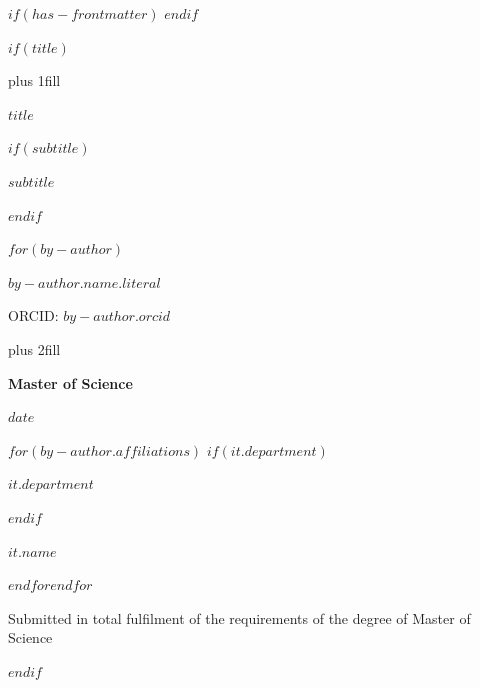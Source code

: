 $if(has-frontmatter)$   
\frontmatter            
$endif$

$if(title)$
\cleardoublepage
\thispagestyle{empty}
{\centering
\hbox{}\vskip 0cm plus 1fill
{\Huge\bfseries $title$ \par}

$if(subtitle)$
\vspace{3ex}
{\Large\bfseries $subtitle$ \par}
$endif$

\vspace{12ex}

$for(by-author)$
{\Large\bfseries $by-author.name.literal$ \par}
\vspace{3ex}
{\Large ORCID: $by-author.orcid$ \par}
\vskip 0cm plus 2fill

{\bfseries\large Master of Science \par}
\vspace{3ex}

{\bfseries\large $date$ \par}

\vspace{12ex}

$for(by-author.affiliations)$%
$if(it.department)$%
{\bfseries\large $it.department$ \par}
\vspace{3ex}
$endif$%
{\bfseries\large $it.name$ \par}
$endfor$$endfor$%
\vspace{12ex}
{\small Submitted in total fulfilment of the requirements of the degree of Master of Science \par}
}
$endif$


% 


% 


% 


% 

